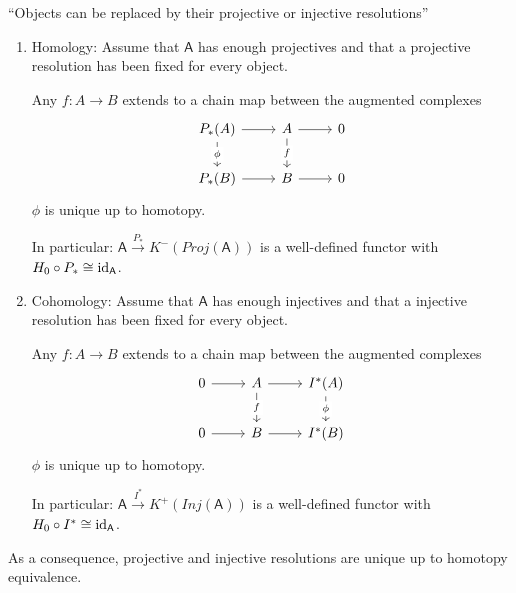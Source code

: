 \documentclass[fontsize=11pt,fleqn,a4paper]{scrartcl}
\begin{document}
\begin{corollary}
\enquote{Objects can be replaced by their projective or injective resolutions}
\begin{multicols}{2}
\begin{enumerate}
\item Homology: Assume that $\mathsf{A}$ has enough projectives and that a projective resolution has been fixed for every object.

Any $f:A\to B$ extends to a chain map between the augmented complexes
\[\begin{tikzcd}
P_\ast(A) \ar[r] \ar[d, "\phi" description] & A \ar[r] \ar[d, "f" description] & 0\\
P_\ast(B) \ar[r] & B \ar[r] & 0
\end{tikzcd}\]
$\phi$ is unique up to homotopy.

In particular: $\mathsf{A} \xrightarrow{P_\ast} K^-(Proj(\mathsf{A}))$ is a well-defined functor with $H_0\circ P_\ast \cong \operatorname{id}_\mathsf{A}$.

\item Cohomology: Assume that $\mathsf{A}$ has enough injectives and that a injective resolution has been fixed for every object.

Any $f:A\to B$ extends to a chain map between the augmented complexes
\[\begin{tikzcd}
0 \ar[r] & A \ar[r] \ar[d, "f" description] & I^\ast(A) \ar[d, "\phi" description] \\
0 \ar[r] & B \ar[r] & I^\ast(B) 
\end{tikzcd}\]
$\phi$ is unique up to homotopy.

In particular: $\mathsf{A} \xrightarrow{I^\ast} K^+(Inj(\mathsf{A}))$ is a well-defined functor with $H_0\circ I^\ast \cong \operatorname{id}_\mathsf{A}$.
\end{enumerate}
\end{multicols}
As a consequence, projective and injective resolutions are unique up to homotopy equivalence.
\end{corollary}
\end{document}
